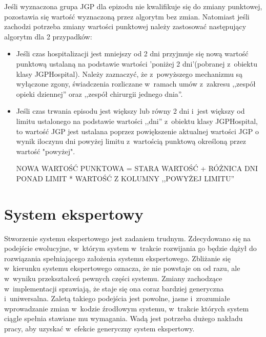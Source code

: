 Jeśli wyznaczona grupa JGP dla epizodu nie kwalifikuje się do zmiany punktowej, pozostawia się wartość wyznaczoną przez algorytm bez zmian. Natomiast jeśli zachodzi potrzeba zmiany wartości punktowej należy zastosować następujący algorytm dla 2 przypadków:
\begin{itemize}
\item Jeśli czas hospitalizacji jest mniejszy od 2 dni przyjmuje się nową wartość punktową ustalaną na podstawie wartości 'poniżej 2 dni'(pobranej z~obiektu klasy JGPHospital). Należy zaznaczyć, że z~powyższego mechanizmu są wyłączone zgony, świadczenia rozliczane w~ramach umów z~zakresu ,,zespół opieki dziennej'' oraz ,,zespół chirurgii jednego dnia''.
\item Jeśli czas trwania episodu jest większy lub równy 2 dni i~jest większy od limitu ustalonego na podstawie wartości ,,dni'' z~obiektu klasy JGPHospital, to wartość JGP jest ustalana poprzez powiększenie aktualnej wartości JGP o wynik iloczynu dni powyżej limitu z~wartością punktową określoną przez wartość "powyżej".

NOWA WARTOŚĆ PUNKTOWA = STARA WARTOŚĆ + RÓŻNICA DNI PONAD LIMIT * WARTOŚĆ Z KOLUMNY ,,POWYŻEJ LIMITU''
\end{itemize} 

\section{System ekspertowy}
\label{sec:systemEkspertowy}

Stworzenie systemu ekspertowego jest zadaniem trudnym\cite{mulawka_ekspertowe}. Zdecydowano się na podejście ewolucyjne, w~którym system w~trakcie rozwijania go będzie dążył do rozwiązania spełniającego założenia systemu ekspertowego. Zbliżanie się w~kierunku systemu ekspertowego oznacza, że nie powstaje on od razu, ale w~wyniku przekształceń pewnych części systemu. Zmiany zachodzące w~implementacji sprawiają, że staje się ona coraz bardziej generyczna i~uniwersalna. Zaletą takiego podejścia jest powolne, jasne i~zrozumiałe wprowadzanie zmian w~kodzie źrodłowym systemu, w~trakcie których system ciągle spełnia stawiane mu wymagania. Wadą jest potrzeba dużego nakładu pracy, aby uzyskać w~efekcie generyczny system ekspertowy\cite{zielonogorski_ekspertowe}.

